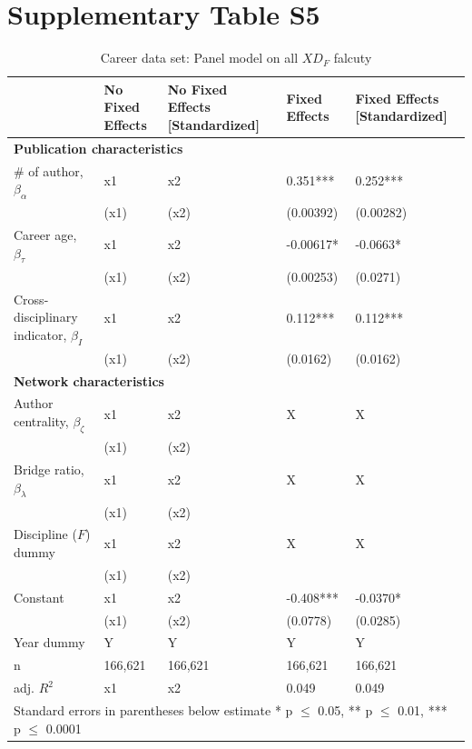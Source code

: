 \documentclass[10pt]{article}          %
\begin{document}
\newpage
\section{Supplementary Table S5}
\begin{table}[H]
\begin{tabular}{m{5cm} m{3.0cm} m{3cm} m{2.5cm} m{2.7cm}}
\hline
\hline
& \textbf{No Fixed Effects} & \textbf{No Fixed Effects [Standardized]} & \textbf{Fixed Effects} & \textbf{Fixed Effects [Standardized]} \\ \hline
\multicolumn{5}{l}{\textbf{Publication characteristics}} \\
\rowcolor{lightgray}
{\# of author, $\beta_\alpha$} & x1 & x2 & 0.351*** & 0.252*** \\
                             & (x1) & (x2) & (0.00392) & (0.00282) \\
\rowcolor{lightgray}
{Career age, $\beta_\tau$} & x1 & x2 & -0.00617* & -0.0663* \\
                         & (x1) & (x2) & (0.00253) & (0.0271) \\
\rowcolor{lightgray}
{Cross-disciplinary indicator, $\beta_I$} & x1 & x2 &  0.112*** & 0.112*** \\
                                        & (x1) & (x2) & (0.0162) & (0.0162) \\ \hline
\multicolumn{5}{l}{\textbf{Network characteristics}} \\
\rowcolor{lightgray}
{Author centrality, $\beta_\zeta$} & x1 & x2 & X & X \\
                             & (x1) & (x2) &  &  \\
\rowcolor{lightgray}
{Bridge ratio, $\beta_\lambda$} & x1 & x2 & X & X \\
                             & (x1) & (x2) & & \\
\rowcolor{lightgray}
{Discipline ($F$) dummy}     & x1 & x2 & X & X \\
                             & (x1) & (x2) & & \\
\rowcolor{lightgray}
{Constant}                 & x1 & x2 & -0.408*** & -0.0370* \\
                         & (x1) & (x2) & (0.0778) & (0.0285) \\
\rowcolor{lightgray}
{Year dummy}            & Y & Y & Y & Y \\ \hline
\rowcolor{lightgray}
{n}                      & 166,621 & 166,621 & 166,621 & 166,621 \\
\rowcolor{lightgray}
{adj. $R^2$}             & x1 & x2 & 0.049 & 0.049 \\ \hline \hline
\multicolumn{5}{l}{\footnotesize{Standard errors in parentheses below estimate * p $\leq$ 0.05, ** p $\leq$ 0.01, *** p $\leq$ 0.0001}}

\end{tabular}
\caption{Career data set: Panel model on all $XD_F$ falcuty}
\label{tbl:sT5}
\end{table}

\bigskip   %
\end{document}
